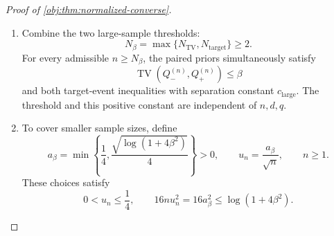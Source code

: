 \begin{proof}[Proof of \cref{obj:thm:normalized-converse}]
\begin{enumerate}
Define the common good event, target threshold, and separation constant by
\[
\mathcal G
=\left\{|W-\mu_W|\le\frac{\mu_W}{2},
          \ |J-1|\le\frac12\right\},
\qquad
N_{\mathrm{target}}=\max\{N_W,N_J\},
\]
\[
c_{\mathrm{large}}
=\frac1{36\cdot1024\,C_{\mathrm{hyp}}\cdot48}>0.
\]
For admissible \(n\ge N_{\mathrm{target}}\), the union bound gives
\[
\Pr(\mathcal G)\ge1-\beta.
\]
On \(\mathcal G\),
\[
W\ge\frac{\mu_W}{2},
\qquad
0<J\le\frac32,
\qquad
\frac WJ\ge\frac{\mu_W}{3}.
\]
Since \(\delta\ge0\) and \(0<q\le1\), it follows that
\[
\frac{\delta}{16q}\frac WJ
\ge\frac{\delta\mu_W}{48}
\ge
\frac{\delta\zeta_{n,d}}
     {36\cdot1024\,C_{\mathrm{hyp}}\cdot48}
=c_{\mathrm{large}}g_{n,d,q}.
\]
Set
\[
m_0=\mu_0.
\]
The exact target identity therefore implies, on \(\mathcal G\),
\[
\tau(P_-)\le m_0-c_{\mathrm{large}}g_{n,d,q},
\qquad
m_0+c_{\mathrm{large}}g_{n,d,q}\le\tau(P_+).
\]
Because \(\Pi_\sigma=\operatorname{Law}(P_\sigma)\), the corresponding prior event masses equal the probabilities of their latent preimages. Hence
\[
\Pi_-\{\tau(P)\le m_0-c_{\mathrm{large}}g_{n,d,q}\}
\ge1-\beta,
\]
\[
\Pi_+\{m_0+c_{\mathrm{large}}g_{n,d,q}\le\tau(P)\}
\ge1-\beta.
\]

\item
Combine the two large-sample thresholds:
\[
N_\beta=\max\{N_{\mathrm{TV}},N_{\mathrm{target}}\}\ge2.
\]
For every admissible \(n\ge N_\beta\), the paired priors simultaneously satisfy
\[
\operatorname{TV}(Q_-^{(n)},Q_+^{(n)})\le\beta
\]
and both target-event inequalities with separation constant
\(c_{\mathrm{large}}\). The threshold and this positive constant are independent of \(n,d,q\).

\item
To cover smaller sample sizes, define
\[
a_\beta
=\min\left\{\frac14,
\frac{\sqrt{\log(1+4\beta^2)}}4\right\}>0,
\qquad
u_n=\frac{a_\beta}{\sqrt n},
\qquad n\ge1.
\]
These choices satisfy
\[
0<u_n\le\frac14,
\qquad
16nu_n^2=16a_\beta^2\le\log(1+4\beta^2).
\]


\end{enumerate}
\end{proof}
